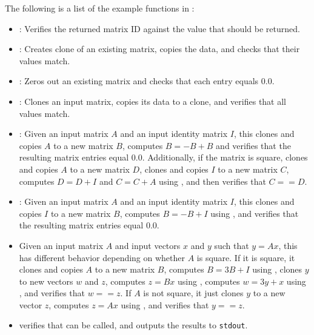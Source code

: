 \noindent The following is a list of the example functions in :
\begin{itemize}
\item {}: Verifies the returned matrix ID against
      the value that should be returned.
\item {}: Creates clone of an existing matrix,
      copies the data, and checks that their values match.  
\item {}: Zeros out an existing matrix and checks
      that each entry equals 0.0.
\item {}: Clones an input matrix, copies its data
      to a clone, and verifies that all values match.
\item {}: Given an input matrix $A$ and an
      input identity matrix $I$, this clones and copies $A$ to a new
      matrix $B$, computes $B = -B+B$ and verifies that the resulting
      matrix entries equal 0.0.  Additionally, if the matrix is
      square, clones and copies $A$ to a new matrix $D$, clones and
      copies $I$ to a new matrix $C$, computes $D = D+I$ and
      $C = C+A$ using , and then verifies that
      $C==D$.
\item {}: Given an input matrix $A$ and an
      input identity matrix $I$, this clones and copies $I$ to a new
      matrix $B$, computes $B = -B+I$ using , and
      verifies that the resulting matrix entries equal 0.0.
\item {} Given an input matrix $A$ and input
      vectors $x$ and $y$ such that $y=Ax$, this has different
      behavior depending on whether $A$ is square.  If it is square,
      it clones and copies $A$ to a new matrix $B$, computes
      $B = 3B+I$ using , clones $y$ to new vectors
      $w$ and $z$, computes $z = Bx$ using , computes
      $w = 3y+x$ using , and verifies that $w==z$.
      If $A$ is not square, it just clones $y$ to a new vector $z$,
      computes $z=Ax$ using , and verifies that
      $y==z$.
\item {} verifies that  can be
      called, and outputs the results to \texttt{stdout}.
\end{itemize}
